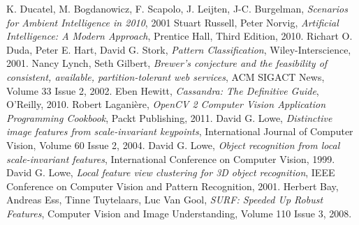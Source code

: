 \documentclass[a4paper,onecolumn,oneside,titlepage,11pt]{report}
\begin{document}
\begin{thebibliography}{99}
K. Ducatel, M. Bogdanowicz, F. Scapolo, J. Leijten, J-C. Burgelman, \emph{Scenarios for Ambient Intelligence in 2010}, 2001
Stuart Russell, Peter Norvig, \emph{Artificial Intelligence: A Modern Approach}, Prentice Hall, Third Edition, 2010.
Richart O. Duda, Peter E. Hart, David G. Stork, \emph{Pattern Classification}, Wiley-Interscience, 2001.
 Nancy Lynch, Seth Gilbert, \emph{Brewer's conjecture and the feasibility of consistent, available, partition-tolerant web services}, ACM SIGACT News, Volume 33 Issue 2, 2002.
Eben Hewitt, \emph{Cassandra: The Definitive Guide}, O'Reilly, 2010.
Robert Laganière, \emph{OpenCV 2 Computer Vision Application Programming Cookbook}, Packt Publishing, 2011.
David G. Lowe, \emph{Distinctive image features from scale-invariant keypoints}, International Journal of Computer Vision, Volume 60 Issue 2, 2004.
David G. Lowe, \emph{Object recognition from local scale-invariant features}, International Conference on Computer Vision, 1999.
David G. Lowe, \emph{Local feature view clustering for 3D object recognition}, IEEE Conference on Computer Vision and Pattern Recognition, 2001.
Herbert Bay, Andreas Ess, Tinne Tuytelaars, Luc Van Gool, \emph{SURF: Speeded Up Robust Features}, Computer Vision and Image Understanding, Volume 110 Issue 3, 2008.

\end{thebibliography}

\appendix
\end{document}
